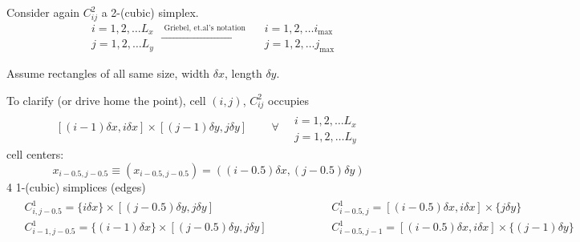 \documentclass[10pt]{amsart}
\begin{document}
\begin{multicols*}{2}
Consider again $C^2_{ij}$ a 2-(cubic) simplex.
\[
\begin{aligned}
  & i = 1,2 , \dots L_x \\ 
  & j = 1,2 , \dots L_y 
  \end{aligned} \xrightarrow{ \text{ Griebel, et.al's notation } }
\begin{aligned}
  & i = 1,2, \dots i_{\text{max}} \\ 
  & j = 1,2, \dots j_{\text{max}}  
  \end{aligned}
\]

Assume rectangles of all same size, width $\delta x$, length $\delta y$.

To clarify (or drive home the point), cell $(i,j)$, $C_{ij}^2$ occupies
\[
  [(i-1)\delta x, i \delta x] \times [(j-1) \delta y, j \delta y ] \qquad \, \forall \, \begin{aligned} & \quad \\ & i = 1, 2, \dots L_x \\
    & j = 1,2, \dots L_y \end{aligned}
\]
  cell centers:
  \[
  x_{i-0.5, j-0.5}  \equiv (x_{i-0.5, j-0.5}) = ((i-0.5)\delta x, (j-0.5)\delta y) 
  \]
4 1-(cubic) simplices (edges)
\[
\begin{gathered}
  \begin{aligned}
&    C^1_{i,j-0.5} = \lbrace i\delta x \rbrace \times [ (j-0.5) \delta y, j \delta y] \\ 
&    C^1_{i-1,j-0.5} = \lbrace (i-1)\delta x \rbrace \times [ (j-0.5) \delta y, j \delta y] \\ 
  \end{aligned} \qquad \qquad \,
    \begin{aligned}
&    C^1_{i-0.5,j} = [ (i-0.5) \delta x, i \delta x] \times \lbrace j\delta y \rbrace   \\ 
&    C^1_{i-0.5,j-1} =  [ (i-0.5) \delta x, i \delta x] \times \lbrace (j-1)\delta y \rbrace  \\ 
  \end{aligned}
\end{gathered}
\]


\end{multicols*}
\end{document}
